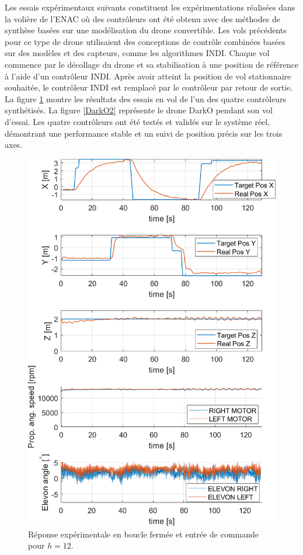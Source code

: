 Les essais expérimentaux suivants constituent les expérimentations réalisées dans la volière de l'ENAC où des contrôleurs ont été obtenu avec des méthodes de synthèse basées sur une modélisation du drone convertible. Les vols précédents pour ce type de drone utilisaient des conceptions de contrôle combinées basées sur des modèles et des capteurs, comme les algorithmes INDI. Chaque vol commence par le décollage du drone et sa stabilisation à une position de référence à l'aide d'un contrôleur INDI. Après avoir atteint la position de vol stationnaire souhaitée, le contrôleur INDI est remplacé par le contrôleur par retour de sortie. La figure \ref{Dabbene_Flight_Test } montre les résultats des essais en vol de l'un des quatre contrôleurs synthétisés. La figure \ref{DarkO2} représente le drone DarkO pendant son vol d'essai. Les quatre contrôleurs ont été testés et validés sur le système réel, démontrant une performance stable et un suivi de position précis sur les trois axes.


\begin{figure}[h]
    \centering
\includegraphics[width=1\columnwidth]{figures/realflight_z_adjust_x_adjust_final_HopeCrop.png}
   \vspace{-0.5cm}\caption{Réponse expérimentale en boucle fermée et entrée de commande pour $h = 12$.}
    \label{Dabbene_Flight_Test }
\end{figure}

